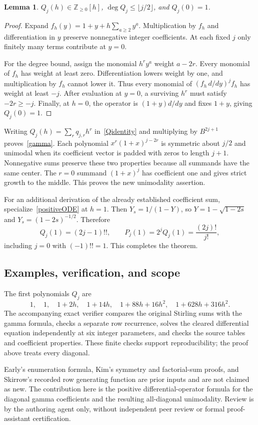 \documentclass[11pt]{article}
\newtheorem{lemma}{Lemma}
\begin{document}
\begin{lemma}\label{positive}
$Q_j(h)\in\mathbb Z_{\geq0}[h]$, $\deg Q_j\leq\lfloor j/2\rfloor$, and
$Q_j(0)=1$.
\end{lemma}
\begin{proof}
Expand $f_h(y)=1+y+h\sum_{a\geq2}y^a$. Multiplication by $f_h$ and
differentiation in $y$ preserve nonnegative integer coefficients.
At each fixed $j$ only finitely many terms contribute at $y=0$.

For the degree bound, assign the monomial $h^r y^a$ weight $a-2r$.
Every monomial of $f_h$ has weight at least zero. Differentiation lowers
weight by one, and multiplication by $f_h$ cannot lower it. Thus every
monomial of $(f_h\,d/dy)^j f_h$ has weight at least $-j$.
After evaluation at $y=0$, a surviving $h^r$ must satisfy $-2r\geq-j$.
Finally, at $h=0$, the operator is $(1+y)d/dy$ and fixes $1+y$,
giving $Q_j(0)=1$.
\end{proof}

Writing $Q_j(h)=\sum_rq_{j,r}h^r$ in~\eqref{Qidentity} and multiplying
by $B^{2j+1}$ proves~\eqref{gamma}. Each polynomial
$x^r(1+x)^{j-2r}$ is symmetric about $j/2$ and unimodal when its
coefficient vector is padded with zeros to length $j+1$. Nonnegative sums
preserve these two properties because all summands have the same center.
The $r=0$ summand $(1+x)^j$ has coefficient one and gives strict growth
to the middle. This proves the new unimodality assertion.

For an additional derivation of the already established coefficient sum,
specialize~\eqref{positiveODE} at $h=1$. Then $Y_s=1/(1-Y)$, so
$Y=1-\sqrt{1-2s}$ and $Y_s=(1-2s)^{-1/2}$. Therefore
\[
 Q_j(1)=(2j-1)!!,\qquad
 P_j(1)=2^jQ_j(1)=\frac{(2j)!}{j!},
\]
including $j=0$ with $(-1)!!=1$. This completes the theorem.

\subsection*{Examples, verification, and scope}
The first polynomials $Q_j$ are
\[
 1,\quad1,\quad1+2h,\quad1+14h,\quad
 1+88h+16h^2,\quad1+628h+316h^2.
\]
The accompanying exact verifier compares the original Stirling sums with
the gamma formula, checks a separate row recurrence, solves the cleared
differential equation independently at six integer parameters, and checks
the source tables and coefficient properties. These finite checks support
reproducibility; the proof above treats every diagonal.

Early's enumeration formula, Kim's symmetry and factorial-sum proofs, and
Skirrow's recorded row generating function are prior inputs and are not
claimed as new. The contribution here is the positive differential-operator
formula for the diagonal gamma coefficients and the resulting all-diagonal
unimodality. Review is by the authoring agent only, without independent
peer review or formal proof-assistant certification.
\end{document}
